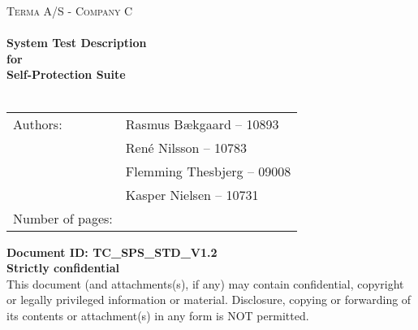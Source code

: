 \documentclass[Main]{subfiles}
\begin{document}
\begin{center}

\textsc{\Large Terma A/S - Company C}\\[0.5cm]


\HRule \\[0.4cm]

{ \huge \bfseries System Test Description}\\[0.4cm]
{ \huge \bfseries for}\\[0.4cm] 
{ \huge \bfseries Self-Protection Suite}\\[0.4cm]

\HRule \\[1.5cm]

\begin{tabular}{p{}|p{}}
\hline 
Authors: & Rasmus Bækgaard -- 10893\\ &René Nilsson -- 10783\\ &Flemming Thesbjerg -- 09008\\ &Kasper Nielsen -- 10731\\ 
\hline 
Number of pages: & \pageref{LastPage} \\
\hline 
\end{tabular} 

\textbf{\Large Document ID: TC\_SPS\_STD\_V1.2}\\
\textbf{\Large Strictly confidential}\\
[0.5 cm]
This document (and attachments(s), if any) may contain confidential, copyright or legally privileged information or material.
Disclosure, copying or forwarding of its contents or attachment(s) in any form is NOT permitted.
\end{center}
\end{document}
